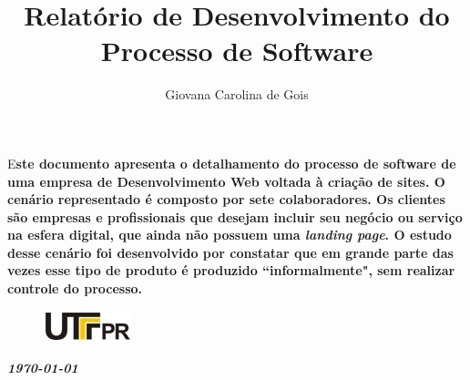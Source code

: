 \documentclass[	DIV=calc,%
							paper=a4,%
							fontsize=12pt,%
							onecolumn]{scrartcl}	 					%
\title{Relatório de Desenvolvimento do Processo de Software}					%
\author{Giovana Carolina de Gois}  	%
\date{}																				%
\newcommand{\initial}[1]{%
     \lettrine[lines=3,lhang=0.3,nindent=0em]{
     				\color{DarkGoldenrod}
     				{\textsf{#1}}}{}}
\begin{document}
\maketitle
\thispagestyle{fancy} 	
\thispagestyle{empty}		%




\initial{E}\textbf{ste documento apresenta o detalhamento do processo de software de uma empresa de Desenvolvimento Web voltada à criação de sites. O cenário representado é composto por sete colaboradores. Os clientes são empresas e profissionais que desejam incluir seu negócio ou serviço na esfera digital, que ainda não possuem uma \textit{landing page}. O estudo desse cenário foi desenvolvido por constatar que em grande parte das vezes esse tipo de produto é produzido ``informalmente", sem realizar controle do processo.}


\begin{figure}
	\centering
	\includegraphics{utfpr}
\end{figure}

\vspace{3cm}
\centerline{\textit{\textbf{\today}}}

\clearpage
    \renewcommand*\listfigurename{Lista de figuras}
\listoffigures

\renewcommand*\listtablename{Lista de tabelas}
\listoftables




\clearpage
\renewcommand{\contentsname}{Sumário}
\tableofcontents
\clearpage

\end{document}
